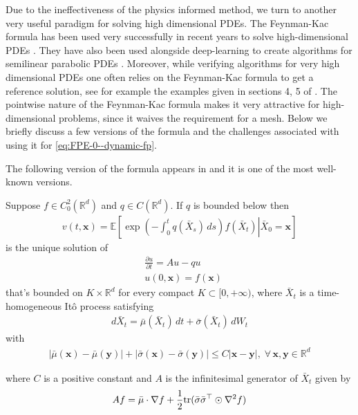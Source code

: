 Due to the ineffectiveness of the physics informed method, we turn to another very useful paradigm for solving high dimensional PDEs. The Feynman-Kac formula \cite{pham2015feynman} has been used very successfully in recent years to solve high-dimensional PDEs \cite{hutzenthaler2021multilevel}. They have also been used alongside deep-learning to create algorithms for semilinear parabolic PDEs \cite{han2018solving}. Moreover, while verifying algorithms for very high dimensional PDEs one often relies on the Feynman-Kac formula to get a reference solution, see for example the examples given in sections 4, 5 of \cite{sirignano2018dgm}. The pointwise nature of the Feynman-Kac formula makes it very attractive for high-dimensional problems, since it waives the requirement for a mesh. Below we briefly discuss a few versions of the formula and the challenges associated with using it for \eqref{eq:FPE-0--dynamic-fp}.

The following version of the formula appears in \cite{oksendal2003stochastic} and it is one of the most well-known versions.
\begin{thm}
Suppose $f\in C^2_0(\mathbb R^d)$ and $q\in C(\mathbb R^d)$. If $q$ is bounded below then
\begin{align}
    v(t, \mathbf x) = \mathbb E\left[\left.\exp\left(-\int_0^t q(\bar X_s)\,ds\right)f(\bar X_t)\right\vert \bar X_0=\mathbf x\right]\label{eq:FK-sol--dynamic-fp}
\end{align}
is the unique solution of
\begin{equation}
\begin{aligned}
    &\frac{\partial u}{\partial t}= Au - qu\\
    & u(0, \mathbf x)=f(\mathbf x)
\end{aligned}\label{eq:FK--dynamic-fp}
\end{equation}
that's bounded on $K\times\mathbb R^d$ for every compact $K\subset[0,+\infty)$, where $\bar X_t$ is a time-homogeneous Itô process satisfying 
\begin{align}
    d\bar X_t = \bar\mu(\bar X_t)\, dt + \bar\sigma(\bar X_t)\,dW_t\label{eq:ito-time-homo--dynamic-fp}
\end{align}
with
\begin{align}
    |\bar\mu(\mathbf x)-\bar\mu(\mathbf y)| + |\bar\sigma(\mathbf x)-\bar\sigma(\mathbf y)|\le C|\mathbf x -\mathbf y|,\;\forall\,\mathbf x, \mathbf y\in\mathbb R^d\label{eq:ito-lipschitz--dynamic-fp}
\end{align}

where $C$ is a positive constant and $A$ is the infinitesimal generator of $\bar X_t$ given by 
\begin{align}
    Af = \bar\mu\cdot\nabla f + \frac{1}{2}{\rm tr}(\bar\sigma\bar\sigma^\top\odot\nabla^2f)\label{eq:ito-gen--dynamic-fp}
\end{align}
\label{thm:FK-Oksendal--dynamic-fp}\end{thm}

